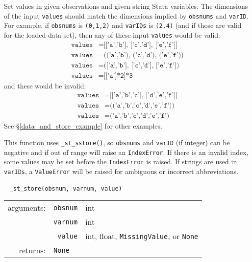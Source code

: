 \documentclass{article}
\begin{document}
			\vspace{1.5mm}
			\noindent Set values in given observations and given string Stata variables. The dimensions of the input \lstinline{values} should match the dimensions implied by \lstinline{obsnums} and \lstinline{varID}. For example, if \lstinline{obsnums} is \lstinline{(0,1,2)} and \lstinline{varIDs} is \lstinline{(2,4)} (and if those are valid for the loaded data set), then any of these input \lstinline{values} would be valid:
			\begin{align*}
				\texttt{values} &= \texttt{[['a','b'], ['c','d'], ['e','f']]} \\
				\texttt{values} &= \texttt{(('a','b'), ('c','d'), ('e','f'))} \\
				\texttt{values} &= \texttt{(['a','b'], ['c','d'], ['e','f'])} \\
				\texttt{values} &= \texttt{[['a']*2]*3}
			\end{align*}
			and these would be invalid:
			\begin{align*}
				\texttt{values} &= \texttt{[['a','b','c'], ['d','e','f']]} \\
				\texttt{values} &= \texttt{(('a','b','c','d','e','f'))} \\
				\texttt{values} &= \texttt{('a','b','c','d','e','f')}
			\end{align*}
See \S\ref{data_and_store_example} for other examples. 
			
			This function uses \lstinline{_st_sstore()}, so \lstinline{obsnums} and \lstinline{varID} (if integer) can be negative and if out of range will raise an \lstinline{IndexError}. If there is an invalid index, some values may be set before the \lstinline{IndexError} is raised. If strings are used in \lstinline{varIDs}, a \lstinline{ValueError} will be raised for ambiguous or incorrect abbreviations. \newline
			
			
			\ \newline
			\noindent \lstinline$_st_store(obsnum, varnum, value)$
								
			\vspace{1.5mm}
			\noindent 
			\indent \begin{tabular}{rrl}
					arguments: & \texttt{obsnum} & int \\
						& \texttt{varnum} & int \\
						& \texttt{value} & int, float, \lstinline$MissingValue$, or \texttt{None} \\
					returns: & \multicolumn{2}{l}{\texttt{None}}
				\end{tabular}
								
\end{document}

